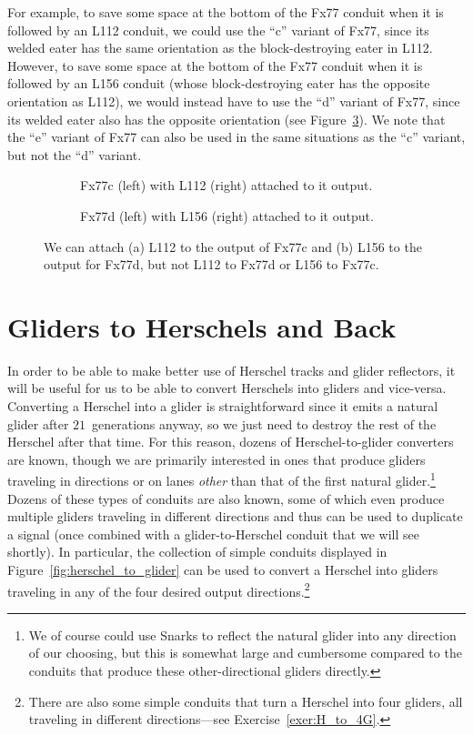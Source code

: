 For example, to save some space at the bottom of the Fx77 conduit when it is followed by an L112 conduit, we could use the ``c'' variant of Fx77, since its welded eater has the same orientation as the block-destroying eater in L112. However, to save some space at the bottom of the Fx77 conduit when it is followed by an L156 conduit (whose block-destroying eater has the opposite orientation as L112), we would instead have to use the ``d'' variant of Fx77, since its welded eater also has the opposite orientation (see Figure~\ref{fig:fx77_variants_with_l}). We note that the ``e'' variant of Fx77 can also be used in the same situations as the ``c'' variant, but not the ``d'' variant.

\begin{figure}[!htb]
	\centering
	\begin{subfigure}{.48\textwidth}
		\centering
		\caption{Fx77c (left) with L112 (right) attached to it output.}
		\label{fig:fx77c_l112}
	\end{subfigure}\quad%
	\begin{subfigure}{.48\textwidth}
		\centering
		\caption{Fx77d (left) with L156 (right) attached to it output.}
		\label{fig:fx77d_l156}
	\end{subfigure}
	\caption{We can attach (a) L112 to the output of Fx77c and (b) L156 to the output for Fx77d, but not L112 to Fx77d or L156 to Fx77c.}\label{fig:fx77_variants_with_l}
\end{figure}


\section{Gliders to Herschels and Back}\label{sec:glider_to_herschel}

In order to be able to make better use of Herschel tracks and glider reflectors, it will be useful for us to be able to convert Herschels into gliders and vice-versa. Converting a Herschel into a glider is straightforward since it emits a natural glider after $21$~generations anyway, so we just need to destroy the rest of the Herschel after that time. For this reason, dozens of Herschel-to-glider converters are known, though we are primarily interested in ones that produce gliders traveling in directions or on lanes \emph{other} than that of the first natural glider.\footnote{We of course could use Snarks to reflect the natural glider into any direction of our choosing, but this is somewhat large and cumbersome compared to the conduits that produce these other-directional gliders directly.} Dozens of these types of conduits are also known, some of which even produce multiple gliders traveling in different directions and thus can be used to duplicate a signal (once combined with a glider-to-Herschel conduit that we will see shortly). In particular, the collection of simple conduits displayed in Figure~\ref{fig:herschel_to_glider} can be used to convert a Herschel into gliders traveling in any of the four desired output directions.\footnote{There are also some simple conduits that turn a Herschel into four gliders, all traveling in different directions---see Exercise~\ref{exer:H_to_4G}.}

